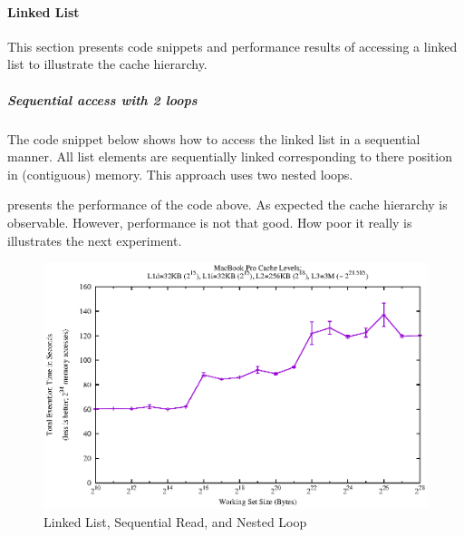\hypertarget{linked-list}{\paragraph{Linked List}\label{linked-list}}

This section presents code snippets and performance results of accessing
a linked list to illustrate the cache hierarchy.

\hypertarget{sequential-access-with-2-loops}{\subparagraph{Sequential
access with 2 loops}\label{sequential-access-with-2-loops}}

The code snippet below shows how to access the linked list in a
sequential manner. All list elements are sequentially linked
corresponding to there position in (contiguous) memory. This approach
uses two nested loops.

\begin{Shaded}
\begin{Highlighting}[]
  
   \NormalTok{l * cur = &list[}\NormalTok{];}
   
  \NormalTok{(} 
  \NormalTok{\{}
    \NormalTok{(} 
    \NormalTok{\{}
      \NormalTok{(}\NormalTok{)cur->pad[}\NormalTok{];}
    \NormalTok{\}}
  \NormalTok{\}}
   
\NormalTok{\}}
\end{Highlighting}
\end{Shaded}

 presents the performance of the code above. As expected
the cache hierarchy is observable. However, performance is not that
good. How poor it really is illustrates the next experiment.

\begin{figure}[htbp]
\centering
\includegraphics{appendix/plots-cache-measurements/plot-linked-list-2-loops}
\caption{Linked List, Sequential Read, and Nested Loop}
\label{ll-seqread-nl}
\end{figure}


